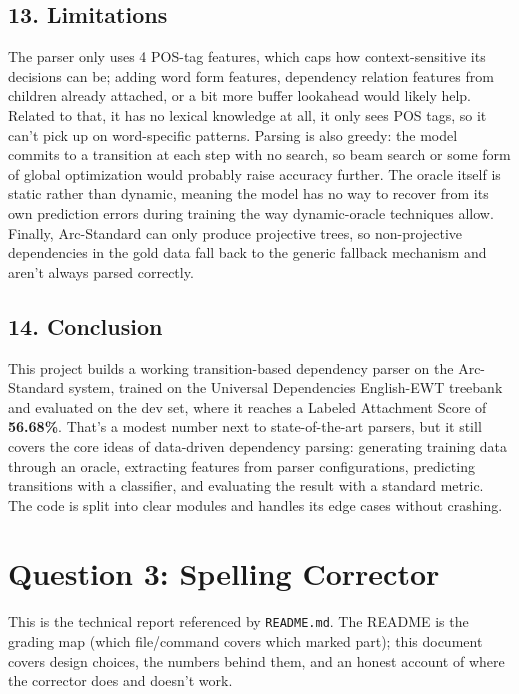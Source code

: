 \documentclass[11pt,a4paper]{article}
\begin{document}
\subsection*{13. Limitations}

The parser only uses 4 POS-tag features, which caps how context-sensitive its decisions can be; adding word form features, dependency relation features from children already attached, or a bit more buffer lookahead would likely help. Related to that, it has no lexical knowledge at all, it only sees POS tags, so it can't pick up on word-specific patterns. Parsing is also greedy: the model commits to a transition at each step with no search, so beam search or some form of global optimization would probably raise accuracy further. The oracle itself is static rather than dynamic, meaning the model has no way to recover from its own prediction errors during training the way dynamic-oracle techniques allow. Finally, Arc-Standard can only produce projective trees, so non-projective dependencies in the gold data fall back to the generic fallback mechanism and aren't always parsed correctly.

\subsection*{14. Conclusion}

This project builds a working transition-based dependency parser on the Arc-Standard system, trained on the Universal Dependencies English-EWT treebank and evaluated on the dev set, where it reaches a Labeled Attachment Score of \textbf{56.68\%}. That's a modest number next to state-of-the-art parsers, but it still covers the core ideas of data-driven dependency parsing: generating training data through an oracle, extracting features from parser configurations, predicting transitions with a classifier, and evaluating the result with a standard metric. The code is split into clear modules and handles its edge cases without crashing.

\clearpage
\section*{Question 3: Spelling Corrector}

This is the technical report referenced by \texttt{README.\allowbreak{}md}. The README is the grading map (which file/command covers which marked part); this document covers design choices, the numbers behind them, and an honest account of where the corrector does and doesn't work.
\end{document}
